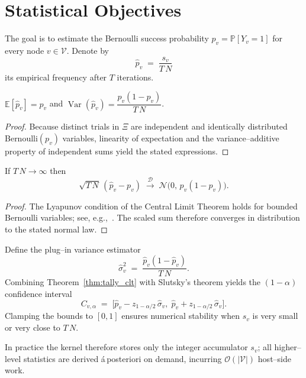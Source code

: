 \section{Statistical Objectives}
\label{subsec:tally_objective}

The goal is to estimate the Bernoulli success probability
$\displaystyle p_v \!=\! \mathbb{P}[Y_v\!=\!1]$ for every node
$v\in\mathcal{V}$.  Denote by
\[
  \widehat{p}_v \;=\; \frac{s_v}{T\,N}
\]
its empirical frequency after $T$ iterations.

\begin{lemma}[Unbiasedness]\label{lem:tally_unbiased}
$\mathbb{E}[\widehat{p}_v]=p_v$ and
$\operatorname{Var}(\widehat{p}_v)=\dfrac{p_v(1-p_v)}{T\,N}$.
\end{lemma}

\begin{proof}
Because distinct trials in $\Xi$ are independent and identically distributed
Bernoulli$(p_v)$ variables, linearity of expectation and the variance--additive
property of independent sums yield the stated expressions.
\end{proof}

\begin{theorem}\label{thm:tally_clt}
If $T\,N\to\infty$ then
\[
  \sqrt{T\,N}\,(\widehat{p}_v-p_v)
  \;\xrightarrow{\;\mathcal{D}\;}\;
  \mathcal{N}\bigl(0,\,p_v(1-p_v)\bigr).
\]
\end{theorem}

\begin{proof}
The Lyapunov condition of the Central Limit Theorem holds for bounded
Bernoulli variables; see, e.g.,~\cite[Th.~27.4]{billingsley1995}.  The scaled
sum therefore converges in distribution to the stated normal law.
\end{proof}

\noindent
Define the plug--in variance estimator
\[
  \widehat{\sigma}_v^2 \;=\; \frac{\widehat{p}_v(1-\widehat{p}_v)}{T\,N}.
\]
Combining Theorem~\ref{thm:tally_clt} with Slutsky's theorem yields the
$(1-\alpha)$ confidence interval
\[
  C_{v,\alpha} \;=\;
  \bigl[\widehat{p}_v - z_{1-\alpha/2}\,\widehat{\sigma}_v,\;
        \widehat{p}_v + z_{1-\alpha/2}\,\widehat{\sigma}_v\bigr].
\]
Clamping the bounds to $[0,1]$ ensures numerical stability when $s_v$ is very
small or very close to $T\,N$.

In practice the kernel therefore stores only the integer accumulator $s_v$;
all higher--level statistics are derived \'a\,posteriori on demand, incurring
$\mathcal{O}(|\mathcal{V}|)$ host--side work.

